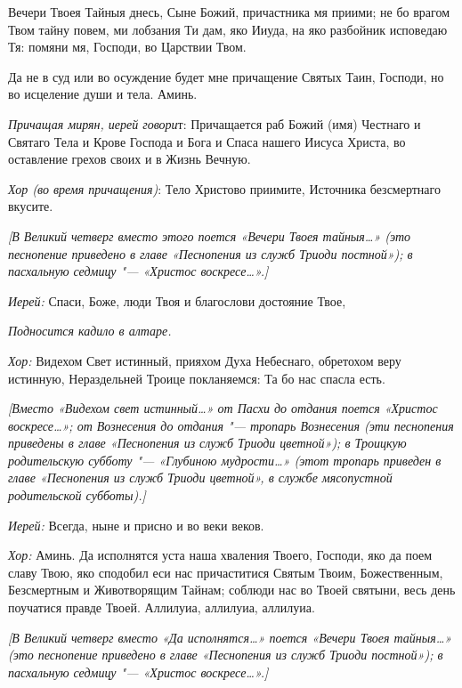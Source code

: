 \begin{mymulticols}
  Вечери Твоея Тайныя днесь, Сыне Божий, причастника мя приими; не бо врагом Твом тайну повем, ми лобзания Ти дам, яко Ииуда, на яко разбойник исповедаю Тя: помяни мя, Господи, во Царствии Твом.


  Да не в суд или во осуждение будет мне причащение Святых Таин, Господи, но во исцеление души и тела. Аминь.




 {\itshape Причащая мирян, иерей говори}т: Причащается раб Божий (имя) Честнаго и Святаго Тела и Крове Господа и Бога и Спаса нашего Иисуса Христа, во оставление грехов своих и в Жизнь Вечную. 


{\itshape Хор (во время причащения)}: Тело Христово приимите, Источника безсмертнаго вкусите.


{\itshape [В Великий четверг вместо этого поется «Вечери Твоея тайныя…» (это песнопение приведено в главе «Песнопения из служб Триоди постной»); в пасхальную седмицу "--- «Христос воскресе…».]}


 {\itshape Иерей:} Спаси, Боже, люди Твоя и благослови достояние Твое, 


{\itshape Подносится кадило в алтаре.} 


{\itshape Хор:} Видехом Свет истинный, прияхом Духа Небеснаго, обретохом веру истинную, Нераздельней Троице покланяемся: Та бо нас спасла есть.


{\itshape [Вместо «Видехом свет истинный…» от Пасхи до отдания поется «Христос воскресе…»; от Вознесения до отдания "--- тропарь Вознесения (эти песнопения приведены в главе «Песнопения из служб Триоди цветной»); в Троицкую родительскую субботу "--- «Глубиною мудрости…» (этот тропарь приведен в главе «Песнопения из служб Триоди цветной», в службе мясопустной родительской субботы).]}


 {\itshape Иерей:} Всегда, ныне и присно и во веки веков.


 {\itshape Хор:} Аминь. Да исполнятся уста наша хваления Твоего, Господи, яко да поем славу Твою, яко сподобил еси нас причаститися Святым Твоим, Божественным, Безсмертным и Животворящим Тайнам; соблюди нас во Твоей святыни, весь день поучатися правде Твоей. Аллилуиа, аллилуиа, аллилуиа. 


{\itshape [В Великий четверг вместо «Да исполнятся…» поется «Вечери Твоея тайныя…» (это песнопение приведено в главе «Песнопения из служб Триоди постной»); в пасхальную седмицу "--- «Христос воскресе…».]}





\end{mymulticols}
